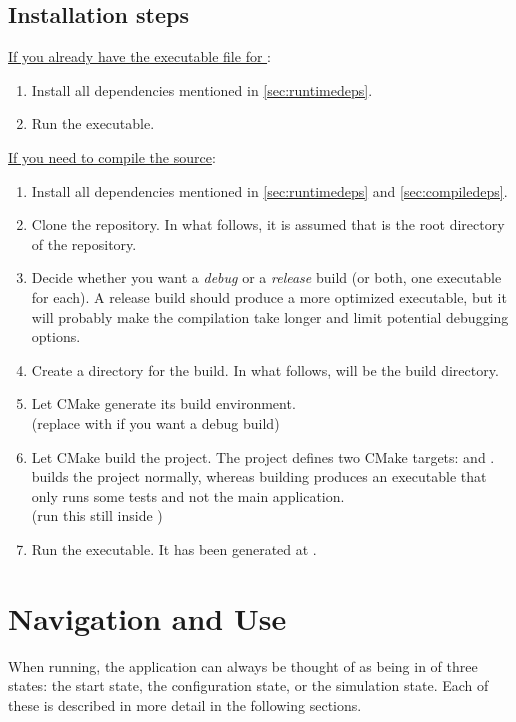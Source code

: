 \documentclass[11pt,a4paper,twoside,openright]{report}
\begin{document}
\subsection{Installation steps}
\underline{If you already have the executable file for \pname{}}:
\begin{enumerate}
	\item
		Install all dependencies mentioned in \ref{sec:runtimedeps}.
	\item
		Run the executable.
\end{enumerate}
\underline{If you need to compile the source}:
\begin{enumerate}
	\item
		Install all dependencies mentioned in \ref{sec:runtimedeps} and \ref{sec:compiledeps}.
	\item
		Clone the repository. In what follows, it is assumed that  is the root directory of the repository.
	\item
		Decide whether you want a \emph{debug} or a \emph{release} build (or both, one executable for each). A release build should produce a more optimized executable, but it will probably make the compilation take longer and limit potential debugging options.
	\item
		Create a directory for the build. In what follows,  will be the build directory.
	\item
		Let CMake generate its build environment.
		\\
		(replace  with  if you want a debug build)
	\item
		Let CMake build the project. The project defines two CMake targets:  and .  builds the project normally, whereas building  produces an executable that only runs some tests and not the main application.
		\\
		(run this still inside )
	\item
		Run the executable. It has been generated at .
\end{enumerate}

\section{Navigation and Use}
When running, the application can always be thought of as being in of three states: the start state, the configuration state, or the simulation state. Each of these is described in more detail in the following sections.
\end{document}
